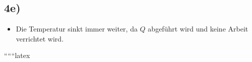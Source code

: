 

\subsection*{4e)}

\begin{itemize}
    \item Die Temperatur sinkt immer weiter, da \( Q \) abgeführt wird und keine Arbeit verrichtet wird.
\end{itemize}

``````latex
